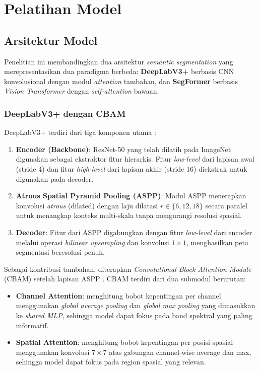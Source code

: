 \section{Pelatihan Model}

\subsection{Arsitektur Model}

Penelitian ini membandingkan dua arsitektur \textit{semantic segmentation} yang merepresentasikan dua paradigma berbeda: \textbf{DeepLabV3+} berbasis CNN konvolusional dengan modul \textit{attention} tambahan, dan \textbf{SegFormer} berbasis \textit{Vision Transformer} dengan \textit{self-attention} bawaan.

\subsubsection{DeepLabV3+ dengan CBAM}

DeepLabV3+ terdiri dari tiga komponen utama \citep{chen2018deeplabv3}:

\begin{enumerate}
    \item \textbf{Encoder (Backbone)}: ResNet-50 yang telah dilatih pada ImageNet digunakan sebagai ekstraktor fitur hierarkis. Fitur \textit{low-level} dari lapisan awal (stride 4) dan fitur \textit{high-level} dari lapisan akhir (stride 16) diekstrak untuk digunakan pada decoder.

    \item \textbf{Atrous Spatial Pyramid Pooling (ASPP)}: Modul ASPP menerapkan konvolusi \textit{atrous} (dilated) dengan laju dilatasi $r \in \{6, 12, 18\}$ secara paralel untuk menangkap konteks multi-skala tanpa mengurangi resolusi spasial.

    \item \textbf{Decoder}: Fitur dari ASPP digabungkan dengan fitur \textit{low-level} dari encoder melalui operasi \textit{bilinear upsampling} dan konvolusi $1\times1$, menghasilkan peta segmentasi beresolusi penuh.
\end{enumerate}

Sebagai kontribusi tambahan, diterapkan \textit{Convolutional Block Attention Module} (CBAM) setelah lapisan ASPP \citep{hsu2022}. CBAM terdiri dari dua submodul berurutan:

\begin{itemize}
    \item \textbf{Channel Attention}: menghitung bobot kepentingan per channel menggunakan \textit{global average pooling} dan \textit{global max pooling} yang dimasukkan ke \textit{shared MLP}, sehingga model dapat fokus pada band spektral yang paling informatif.
    \item \textbf{Spatial Attention}: menghitung bobot kepentingan per posisi spasial menggunakan konvolusi $7\times7$ atas gabungan channel-wise average dan max, sehingga model dapat fokus pada region spasial yang relevan.
\end{itemize}

